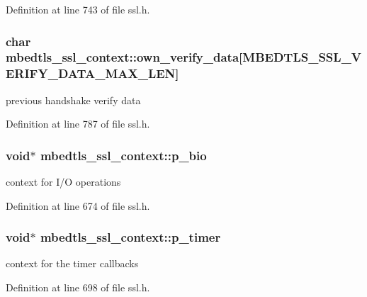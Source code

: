 Definition at line 743 of file ssl.\-h.

\hypertarget{structmbedtls__ssl__context_a55b04578ece6b1621c8f1629481506f1}{
\subsubsection[{own\-\_\-verify\-\_\-data}]{\setlength{\rightskip}{0pt plus 5cm}char mbedtls\-\_\-ssl\-\_\-context\-::own\-\_\-verify\-\_\-data\mbox{[}M\-B\-E\-D\-T\-L\-S\-\_\-\-S\-S\-L\-\_\-\-V\-E\-R\-I\-F\-Y\-\_\-\-D\-A\-T\-A\-\_\-\-M\-A\-X\-\_\-\-L\-E\-N\mbox{]}}}\label{structmbedtls__ssl__context_a55b04578ece6b1621c8f1629481506f1}
previous handshake verify data 

Definition at line 787 of file ssl.\-h.

\hypertarget{structmbedtls__ssl__context_aec081479009cd17997795d6eedf2c641}{
\subsubsection[{p\-\_\-bio}]{\setlength{\rightskip}{0pt plus 5cm}void$\ast$ mbedtls\-\_\-ssl\-\_\-context\-::p\-\_\-bio}}\label{structmbedtls__ssl__context_aec081479009cd17997795d6eedf2c641}
context for I/\-O operations 

Definition at line 674 of file ssl.\-h.

\hypertarget{structmbedtls__ssl__context_ae6aa3c32c60b630754aa03c6aab6a1b7}{
\subsubsection[{p\-\_\-timer}]{\setlength{\rightskip}{0pt plus 5cm}void$\ast$ mbedtls\-\_\-ssl\-\_\-context\-::p\-\_\-timer}}\label{structmbedtls__ssl__context_ae6aa3c32c60b630754aa03c6aab6a1b7}
context for the timer callbacks 

Definition at line 698 of file ssl.\-h.

